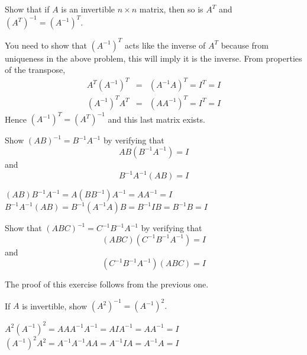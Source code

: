 \documentclass{ximera}
\begin{document}
\begin{problem}\label{prb:4.49}Show that if $A$ is an invertible $n\times n$ matrix, then so is
$A^{T} $ and $\left( A^{T}\right) ^{-1}=\left( A^{-1}\right) ^{T}.$
\begin{hint}
 You need to show that $\left( A^{-1}\right) ^{T}$ acts like the inverse of $A^{T}
$ because from uniqueness in the above problem, this will imply it is the
inverse. From properties of the transpose,
\begin{eqnarray*}
A^{T}\left( A^{-1}\right) ^{T} &=&\left( A^{-1}A\right) ^{T}=I^{T}=I \\
\left( A^{-1}\right) ^{T}A^{T} &=&\left( AA^{-1}\right) ^{T}=I^{T}=I
\end{eqnarray*}
Hence $\left( A^{-1}\right) ^{T}=\left( A^{T}\right) ^{-1}$ and this last
matrix exists.
\end{hint}
\end{problem}

\begin{problem}\label{prb:4.50}Show $\left( AB\right) ^{-1}=B^{-1}A^{-1}$ by verifying that
\begin{equation*}
AB\left(
B^{-1}A^{-1}\right) =I
\end{equation*} and
\begin{equation*}
B^{-1}A^{-1}\left( AB\right) =I
\end{equation*}

\begin{hint}
$\left( AB\right)
B^{-1}A^{-1}=A\left( BB^{-1}\right) A^{-1}=AA^{-1}=I$ $B^{-1}A^{-1}\left(
AB\right) =B^{-1}\left( A^{-1}A\right) B=B^{-1}IB=B^{-1}B=I$
\end{hint}
\end{problem}

\begin{problem}\label{prb:4.51}Show that $\left( ABC\right) ^{-1}=C^{-1}B^{-1}A^{-1}$ by verifying
that
\[
\left( ABC\right) \left( C^{-1}B^{-1}A^{-1}\right) =I
\]
and
\[\left( C^{-1}B^{-1}A^{-1}\right)\left( ABC\right) =I
\]

\begin{hint}
The proof of this exercise follows from the previous one.
\end{hint}
\end{problem}

\begin{problem}\label{prb:4.52}If $A$ is invertible, show $\left( A^{2}\right) ^{-1}=\left(
A^{-1}\right) ^{2}.$ 

\begin{hint}
$A^{2}\left( A^{-1}\right) ^{2}=AAA^{-1}A^{-1}=AIA^{-1}=AA^{-1}=I$ $\left(
A^{-1}\right) ^{2}A^{2}=A^{-1}A^{-1}AA=A^{-1}IA=A^{-1}A=I$
\end{hint}
\end{problem}
\end{document}
